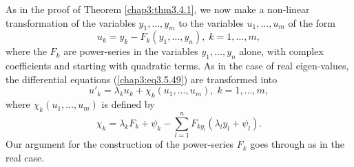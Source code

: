 As in the proof of Theorem \ref{chap3:thm3.4.1}, we now make a
non-linear transformation of the variables $y_1, \ldots, y_m$ to the
variables $u_1,\ldots, u_m$ of the form\pageoriginale 
$$
u_k = y_k - F_k(y_1, \ldots, y_n), \; k =1, \ldots, m,
$$
where the $F_k$ are power-series in the variables $y_1, \ldots, y_n$
alone, with complex coefficients and starting with quadratic terms. As
in the case of real eigen-values, the differential equations
(\ref{chap3:eq3.5.49}) are transformed into 
\begin{equation*}
u'_k = \lambda_k u_k + \chi_k (u_1, \ldots, u_m), \; k =1, \ldots, m,
\tag{3.5.51}\label{chap3:eq3.5.51} 
\end{equation*}
where $\chi_k(u_1, \ldots,u_m)$ is defined by
\begin{equation*}
\chi_k = \lambda_k F_k + \psi_k - \sum\limits^n_{l=1} F_{ky_l}
(\lambda_l y_l + \psi_l). \tag*{$(\ast)$} 
\end{equation*}
Our argument for the construction of the power-series $F_k$ goes
through as in the real case. 

